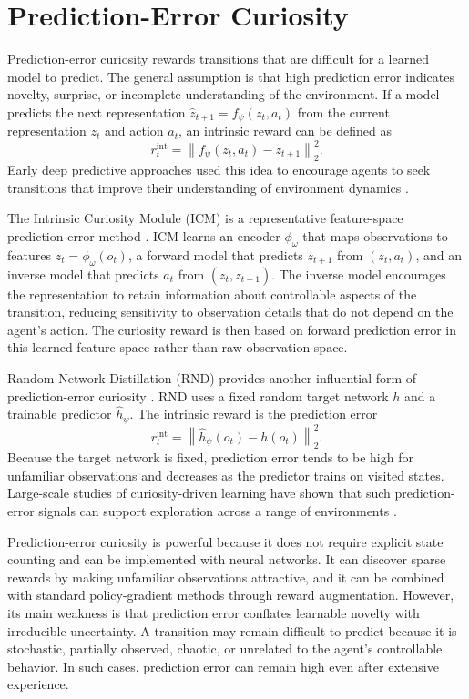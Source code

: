 \section{Prediction-Error Curiosity}
\label{sec:prediction_error_curiosity}

Prediction-error curiosity rewards transitions that are difficult for a learned model to predict.
The general assumption is that high prediction error indicates novelty, surprise, or incomplete understanding of the environment.
If a model predicts the next representation $\hat{z}_{t+1}=f_\psi(z_t,a_t)$ from the current representation $z_t$ and action $a_t$, an intrinsic reward can be defined as
\begin{equation}
    r_t^{\mathrm{int}} = \left\lVert f_\psi(z_t,a_t)-z_{t+1}\right\rVert_2^2.
\end{equation}
Early deep predictive approaches used this idea to encourage agents to seek transitions that improve their understanding of environment dynamics \parencite{stadie-2015}.

The Intrinsic Curiosity Module (ICM) is a representative feature-space prediction-error method \parencite{pathak-2017}.
ICM learns an encoder $\phi_\omega$ that maps observations to features $z_t=\phi_\omega(o_t)$, a forward model that predicts $z_{t+1}$ from $(z_t,a_t)$, and an inverse model that predicts $a_t$ from $(z_t,z_{t+1})$.
The inverse model encourages the representation to retain information about controllable aspects of the transition, reducing sensitivity to observation details that do not depend on the agent's action.
The curiosity reward is then based on forward prediction error in this learned feature space rather than raw observation space.

Random Network Distillation (RND) provides another influential form of prediction-error curiosity \parencite{burda-2018B}.
RND uses a fixed random target network $h$ and a trainable predictor $\hat{h}_\psi$.
The intrinsic reward is the prediction error
\begin{equation}
    r_t^{\mathrm{int}} = \left\lVert \hat{h}_\psi(o_t)-h(o_t)\right\rVert_2^2.
\end{equation}
Because the target network is fixed, prediction error tends to be high for unfamiliar observations and decreases as the predictor trains on visited states.
Large-scale studies of curiosity-driven learning have shown that such prediction-error signals can support exploration across a range of environments \parencite{burda-2018A}.

Prediction-error curiosity is powerful because it does not require explicit state counting and can be implemented with neural networks.
It can discover sparse rewards by making unfamiliar observations attractive, and it can be combined with standard policy-gradient methods through reward augmentation.
However, its main weakness is that prediction error conflates learnable novelty with irreducible uncertainty.
A transition may remain difficult to predict because it is stochastic, partially observed, chaotic, or unrelated to the agent's controllable behavior.
In such cases, prediction error can remain high even after extensive experience.

